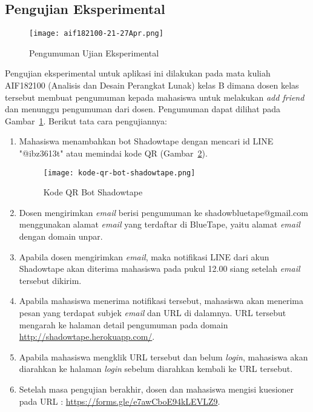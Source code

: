 \subsection{Pengujian Eksperimental}
\begin{figure}[H]
	\centering  
	\texttt{[image: aif182100-21-27Apr.png]}
	\caption[Pengumuman Ujian Eksperimental]{Pengumuman Ujian Eksperimental} 
	\label{fig:aif182100-21-27Apr} 
\end{figure}
Pengujian eksperimental untuk aplikasi ini dilakukan pada mata kuliah AIF182100 (Analisis dan Desain Perangkat Lunak) kelas B dimana dosen kelas tersebut membuat pengumuman kepada mahasiswa untuk melakukan \textit{add friend} dan menunggu pengumuman dari dosen. Pengumuman dapat dilihat pada Gambar~\ref{fig:aif182100-21-27Apr}. Berikut tata cara pengujiannya:
\begin{enumerate}
\item Mahasiswa menambahkan bot Shadowtape dengan mencari id LINE "@ibz3613t" atau memindai kode QR (Gambar~\ref{fig:kode-qr-bot-shadowtape}).

\begin{figure}[H]
	\centering  
	\texttt{[image: kode-qr-bot-shadowtape.png]}  
	\caption[Kode QR Bot Shadowtape]{Kode QR Bot Shadowtape} 
	\label{fig:kode-qr-bot-shadowtape} 
\end{figure}

\item Dosen mengirimkan \textit{email} berisi pengumuman ke shadowbluetape@gmail.com menggunakan alamat \textit{email} yang terdaftar di BlueTape, yaitu alamat \textit{email} dengan domain unpar.
\item Apabila dosen mengirimkan \textit{email}, maka notifikasi LINE dari akun Shadowtape akan diterima mahasiswa pada pukul 12.00 siang setelah \textit{email} tersebut dikirim.
\item Apabila mahasiswa menerima notifikasi tersebut, mahasiswa akan menerima pesan yang terdapat subjek \textit{email} dan URL di dalamnya. URL tersebut mengarah ke halaman detail pengumuman pada domain \url{http://shadowtape.herokuapp.com/}.
\item Apabila mahasiswa mengklik URL tersebut dan belum \textit{login}, mahasiswa akan diarahkan ke halaman \textit{login} sebelum diarahkan kembali ke URL tersebut.
\item Setelah masa pengujian berakhir, dosen dan mahasiswa mengisi kuesioner pada URL : \url{https://forms.gle/e7awCboE94kLEVLZ9}.
\end{enumerate}

